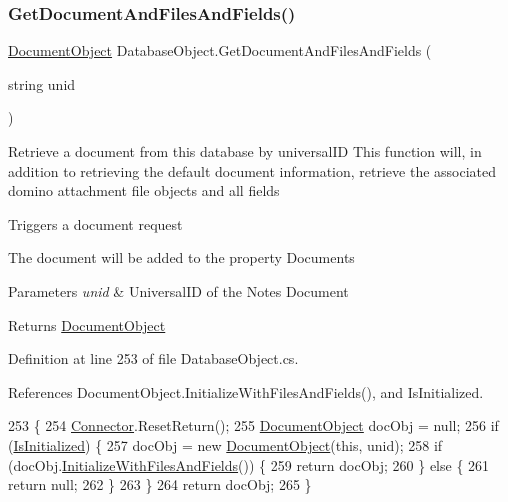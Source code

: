\subsubsection{\texorpdfstring{Get\+Document\+And\+Files\+And\+Fields()}{GetDocumentAndFilesAndFields()}\hspace{0.1cm}{\footnotesize\ttfamily [1/2]}}
{\footnotesize\ttfamily \mbox{\hyperlink{class_document_object}{Document\+Object}} Database\+Object.\+Get\+Document\+And\+Files\+And\+Fields (\begin{DoxyParamCaption}\item[{string}]{unid }\end{DoxyParamCaption})}



Retrieve a document from this database by universal\+ID This function will, in addition to retrieving the default document information, retrieve the associated domino attachment file objects and all fields 

Triggers a document request

The document will be added to the property \textquotesingle{}Documents\textquotesingle{}


\begin{DoxyParams}{Parameters}
{\em unid} & Universal\+ID of the Notes Document\\
\hline
\end{DoxyParams}
\begin{DoxyReturn}{Returns}
\mbox{\hyperlink{class_document_object}{Document\+Object}}
\end{DoxyReturn}


Definition at line 253 of file Database\+Object.\+cs.



References Document\+Object.\+Initialize\+With\+Files\+And\+Fields(), and Is\+Initialized.


\begin{DoxyCode}
253                                                                     \{
254         \mbox{\hyperlink{class_connector}{Connector}}.ResetReturn();
255         \mbox{\hyperlink{class_document_object}{DocumentObject}} docObj = null;
256         \textcolor{keywordflow}{if} (\mbox{\hyperlink{class_database_object_a5fe036d32a30eb10d1b3f6a30263f740}{IsInitialized}}) \{
257             docObj = \textcolor{keyword}{new} \mbox{\hyperlink{class_document_object}{DocumentObject}}(\textcolor{keyword}{this}, unid);
258             \textcolor{keywordflow}{if} (docObj.\mbox{\hyperlink{class_document_object_a16350c0f471c95c82b418b7f1dc53694}{InitializeWithFilesAndFields}}()) \{
259                 \textcolor{keywordflow}{return} docObj;
260             \} \textcolor{keywordflow}{else} \{
261                 \textcolor{keywordflow}{return} null;
262             \}
263         \}
264         \textcolor{keywordflow}{return} docObj;
265     \}
\end{DoxyCode}
\mbox{\label{class_database_object_a3de8e675278647046b0e48109ab0784f}} 
